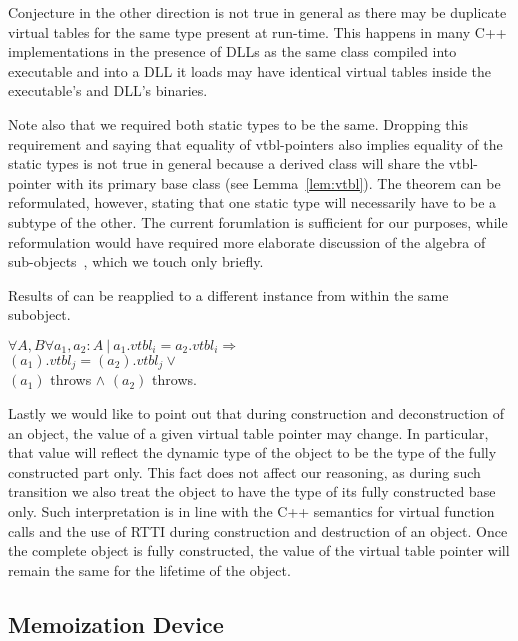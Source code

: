 Conjecture in the other direction is not true in general as there may be 
duplicate virtual tables for the same type present at run-time. This happens in 
many C++ implementations in the presence of DLLs as the same class compiled into 
executable and into a DLL it loads may have identical virtual tables inside the 
executable's and DLL's binaries.

Note also that we required both static types to be the same. Dropping this 
requirement and saying that equality of vtbl-pointers also implies equality of 
the static types is not true in general because a derived class will share the 
vtbl-pointer with its primary base class (see Lemma~\ref{lem:vtbl}). The theorem 
can be reformulated, however, stating that one static type will necessarily have 
to be a subtype of the other. The current forumlation is sufficient for our 
purposes, while reformulation would have required more elaborate discussion of 
the algebra of sub-objects~\cite{RDL11}, which we touch only briefly.

\begin{corollary}
Results of  can be reapplied to a different instance from 
within the same subobject. 

$\forall A,B \forall a_1, a_2 : A\ |\ a_1.vtbl_i = a_2.vtbl_i \Rightarrow$ \\
$(a_1).vtbl_j = $$(a_2).vtbl_j \vee$ \\
$(a_1)$ throws $\wedge$ $(a_2)$ throws.
\label{crl:vtbl}
\end{corollary}

\noindent
Lastly we would like to point out that during construction and deconstruction of 
an object, the value of a given virtual table pointer may change. In particular, 
that value will reflect the dynamic type of the object to be the type of the 
fully constructed part only. This fact does not affect our reasoning, as during 
such transition we also treat the object to have the type of its fully 
constructed base only. Such interpretation is in line with the C++ semantics for 
virtual function calls and the use of RTTI during construction and destruction of an 
object. Once the complete object is fully constructed, the value of the virtual 
table pointer will remain the same for the lifetime of the object.

\subsection{Memoization Device}
\label{sec:memdev}

